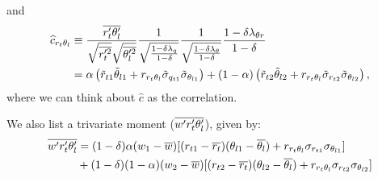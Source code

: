 and
\begin{align}
    \widehat{c}_{r_t \theta_l}
    &\equiv\frac{\overline{r_t' \theta_l'}}{\sqrt{\overline{r_t'^2}}\sqrt{\overline{\theta_l'^2}}} \frac{1}{\sqrt{\frac{1-\delta \lambda_q}{1-\delta}}}\frac{1}{\sqrt{\frac{1-\delta \lambda_\theta}{1-\delta}}}\frac{1 - \delta \lambda_{\theta r} }{1 - \delta} \nonumber\\
    &= \alpha \left( \tilde{r}_{t1} \tilde{\theta}_{l1} + r_{r_t \theta_l} \tilde{\sigma}_{q_{t1}} \tilde{\sigma}_{\theta_{l1}} \right) + (1 - \alpha) \left( \tilde{r}_{t2} \tilde{\theta}_{l2} + r_{r_t \theta_l} \tilde{\sigma}_{r_{t2}} \tilde{\sigma}_{\theta_{l2}} \right),
    \label{eq:c_hat_r_t_theta_l_nondim}
\end{align}
where we can think about $\widehat{c}$ as the correlation.

We also list a trivariate moment ($\overline{w' r_t' \theta_l'}$), given by:
\begin{align}
    \overline{w' r_t' \theta_l'}
    &= (1 - \delta) \alpha (w_1 - \overline{w}) [(r_{t1} - \overline{r_t}) (\theta_{l1} - \overline{\theta_l}) + r_{r_t \theta_l} \sigma_{r_{t1}} \sigma_{\theta_{l1}}] \nonumber\\
    &+ (1 - \delta) (1 - \alpha) (w_2 - \overline{w}) [(r_{t2} - \overline{r_t}) (\theta_{l2} - \overline{\theta_l}) + r_{r_t \theta_l} \sigma_{r_{t2}} \sigma_{\theta_{l2}}]
    \label{eq:w_prime_r_t_prime_t_l_prime_bar}
\end{align}